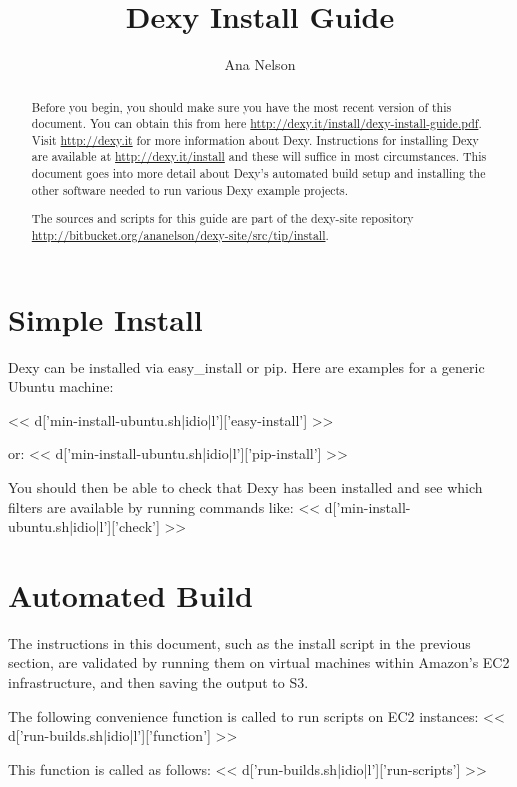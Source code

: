 \documentclass{tufte-handout}
\title{Dexy Install Guide}
\author{Ana Nelson}
\begin{document}
\maketitle

\begin{abstract}
Before you begin, you should make sure you have the most recent version of this document. You can obtain this from here \url{http://dexy.it/install/dexy-install-guide.pdf}. Visit \url{http://dexy.it} for more information about Dexy. Instructions for installing Dexy are available at \url{http://dexy.it/install} and these will suffice in most circumstances. This document goes into more detail about Dexy's automated build setup and installing the other software needed to run various Dexy example projects.

The sources and scripts for this guide are part of the dexy-site repository \url{http://bitbucket.org/ananelson/dexy-site/src/tip/install}.

\end{abstract}

\section{Simple Install}

Dexy can be installed via easy\_install or pip. Here are examples for a generic Ubuntu machine:

<< d['min-install-ubuntu.sh|idio|l']['easy-install'] >>

\noindent or:
<< d['min-install-ubuntu.sh|idio|l']['pip-install'] >>

\noindent You should then be able to check that Dexy has been installed and see which filters are available by running commands like:
<< d['min-install-ubuntu.sh|idio|l']['check'] >>

\section{Automated Build}

The instructions in this document, such as the install script in the previous section, are validated by running them on virtual machines within Amazon's EC2 infrastructure, and then saving the output to S3.

\noindent The following convenience function is called to run scripts on EC2 instances:
<< d['run-builds.sh|idio|l']['function'] >>

\noindent This function is called as follows:
<< d['run-builds.sh|idio|l']['run-scripts'] >>
\end{document}
